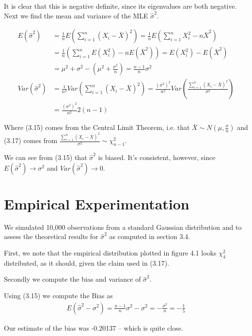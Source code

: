 \documentclass[paper=a4, fontsize=11pt]{scrartcl} %
\numberwithin{equation}{section} %
\numberwithin{figure}{section} %
\numberwithin{table}{section} %
\begin{document}
It is clear that this is negative definite, since its eigenvalues are both negative. Next we find the mean and variance of the MLE $\hat{\sigma}^2$.


\begin{align}
E(\hat{\sigma}^2) &= \frac{1}{n}E\left(\sum_{i=1}^{n}(X_i - \bar{X})^2\right) = \frac{1}{n}E\left(\sum_{i=1}^{n} X_i^2 - n\bar{X}^2\right) \\
&= \frac{1}{n}\left(\sum_{i=1}^{n} E(X_i^2) - nE(\bar{X}^2)\right) = E(X_i^2) - E(\bar{X}^2) \\
&= \mu^2 + \sigma^2 - \left(\mu^2 + \frac{\sigma^2}{n}\right) = \frac{n-1}{n}\sigma^2 \\
Var(\hat{\sigma}^2) &= \frac{1}{n^2}Var\left(\sum_{i=1}^{n}(X_i-\bar{X})^2\right)= \frac{(\sigma^2)^2}{n^2}Var\left(\frac{\sum_{i=1}^{n}(X_i-\bar{X})^2}{\sigma^2}\right) \\
&= \frac{(\sigma^2)^2}{n^2}2(n-1)
\end{align}

Where (3.15) comes from the Central Limit Theorem, i.e. that $\bar{X} \sim N(\mu, \frac{\sigma}{n})$ and (3.17) comes from $\frac{\sum_{i=1}^{n}(X_i-\bar{X})^2}{\sigma^2} \sim \chi^2_{n-1}$.
\newline

We can see from (3.15) that $\hat{\sigma}^2$ is biased. It's consistent, however, since $E(\hat{\sigma}^2) \rightarrow \sigma^2$ and $Var(\hat{\sigma}^2) \rightarrow 0$.

\section{Empirical Experimentation}

We simulated 10,000 observations from a standard Gaussian distribution and to assess the theoretical results for $\hat{\sigma}^2$ as computed in section 3.4.  

First, we note that the empirical distribution plotted in figure 4.1 looks $\chi^2_{4}$ distributed, as it should, given the claim used in (3.17).

Secondly we compute the bias and variance of $\hat{\sigma}^2$. 

Using (3.15) we compute the Bias as 
\begin{align*}
E(\hat{\sigma}^2 - \sigma^2) = \frac{n-1}{n}\sigma^2 - \sigma^2 = - \frac{\sigma^2}{n} = -\frac{1}{5}
\end{align*} 

Our estimate of the bias was -0.20137 -- which is quite close.
\end{document}
